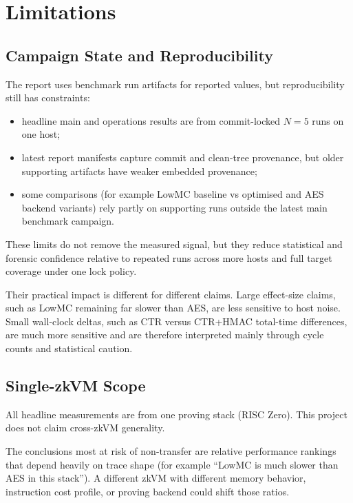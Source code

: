 \chapter{Limitations}

\section{Campaign State and Reproducibility}

The report uses benchmark run artifacts for reported values, but reproducibility
still has constraints:

\begin{itemize}
\item headline main and operations results are from commit-locked \(N=5\) runs on
one host;
\item latest report manifests capture commit and clean-tree provenance, but older
supporting artifacts have weaker embedded provenance;
\item some comparisons (for example LowMC baseline vs optimised and AES backend
variants) rely partly on supporting runs outside the latest main benchmark
campaign.
\end{itemize}

These limits do not remove the measured signal, but they reduce statistical and
forensic confidence relative to repeated runs across more hosts and full target
coverage under one lock policy.

Their practical impact is different for different claims. Large effect-size
claims, such as LowMC remaining far slower than AES, are less sensitive to host
noise. Small wall-clock deltas, such as CTR versus CTR+HMAC total-time
differences, are much more sensitive and are therefore interpreted mainly through
cycle counts and statistical caution.

\section{Single-zkVM Scope}

All headline measurements are from one proving stack (RISC Zero). This project
does not claim cross-zkVM generality.

The conclusions most at risk of non-transfer are relative performance rankings
that depend heavily on trace shape (for example ``LowMC is much slower than AES
in this stack''). A different zkVM with different memory behavior, instruction
cost profile, or proving backend could shift those ratios.

